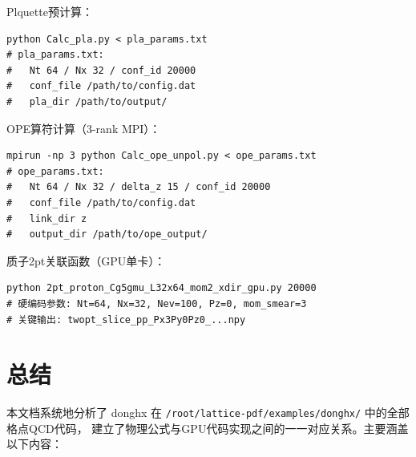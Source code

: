 \documentclass[12pt,a4paper]{ctexart}
\begin{document}
\begin{codebox}[典型运行示例]
Plquette预计算：
\begin{lstlisting}[style=bashstyle]
python Calc_pla.py < pla_params.txt
# pla_params.txt:
#   Nt 64 / Nx 32 / conf_id 20000
#   conf_file /path/to/config.dat
#   pla_dir /path/to/output/
\end{lstlisting}

OPE算符计算（3-rank MPI）：
\begin{lstlisting}[style=bashstyle]
mpirun -np 3 python Calc_ope_unpol.py < ope_params.txt
# ope_params.txt:
#   Nt 64 / Nx 32 / delta_z 15 / conf_id 20000
#   conf_file /path/to/config.dat
#   link_dir z
#   output_dir /path/to/ope_output/
\end{lstlisting}

质子2pt关联函数（GPU单卡）：
\begin{lstlisting}[style=bashstyle]
python 2pt_proton_Cg5gmu_L32x64_mom2_xdir_gpu.py 20000
# 硬编码参数: Nt=64, Nx=32, Nev=100, Pz=0, mom_smear=3
# 关键输出: twopt_slice_pp_Px3Py0Pz0_...npy
\end{lstlisting}
\end{codebox}

\section{总结}

本文档系统地分析了 donghx 在 \texttt{/root/lattice-pdf/examples/donghx/} 中的全部格点QCD代码，
建立了物理公式与GPU代码实现之间的一一对应关系。主要涵盖以下内容：
\end{document}
